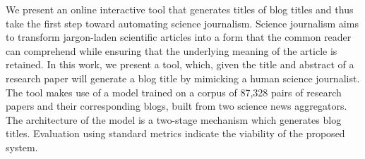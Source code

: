 We present an online interactive tool that generates titles of blog titles and thus take the first step toward automating science journalism. Science journalism aims to transform jargon-laden scientific articles into a form that the common reader can comprehend while ensuring that the underlying meaning of the article is retained. In this work, we present a tool, which, given the title and abstract of a research paper will generate a blog title by mimicking a human science journalist. The tool makes use of a model trained on a corpus of 87,328 pairs of research papers and their corresponding blogs, built from two science news aggregators. The architecture of the model is a two-stage mechanism which generates blog titles. Evaluation using standard metrics indicate the viability of the proposed system.
